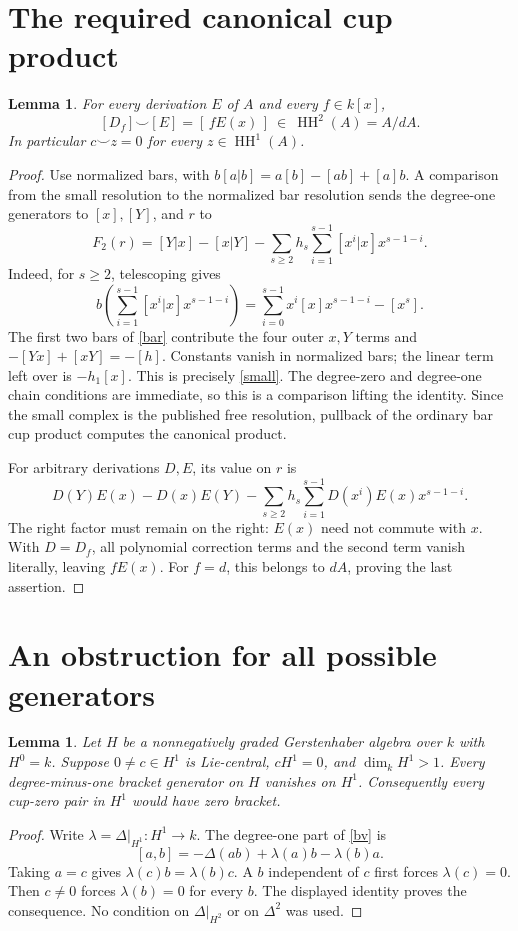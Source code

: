 \documentclass[11pt]{article}
\newtheorem{lemma}[theorem]{Lemma}
\theoremstyle{remark}\newtheorem{remark}[theorem]{Remark}
\newcommand{\HH}{\operatorname{HH}}
\begin{document}
\section{The required canonical cup product}
\begin{lemma}\label{cup}
For every derivation \(E\) of \(A\) and every \(f\in k[x]\),
\[
 [D_f]\smile[E]=[\,fE(x)\,]\ \in\ \HH^2(A)=A/dA.
\]
In particular \(c\smile z=0\) for every \(z\in\HH^1(A)\).
\end{lemma}
\begin{proof}
Use normalized bars, with
\(b[a|b]=a[b]-[ab]+[a]b\).
A comparison from the small resolution to the normalized bar resolution
sends the degree-one generators to \([x],[Y]\), and \(r\) to
\begin{equation}\label{bar}
 F_2(r)=[Y|x]-[x|Y]
       -\sum_{s\ge2}h_s\sum_{i=1}^{s-1}[x^i|x]x^{s-1-i}.
\end{equation}
Indeed, for \(s\ge2\), telescoping gives
\[
 b\!\left(\sum_{i=1}^{s-1}[x^i|x]x^{s-1-i}\right)
 =\sum_{i=0}^{s-1}x^i[x]x^{s-1-i}-[x^s].
\]
The first two bars of \eqref{bar} contribute the four outer \(x,Y\)
terms and \(-[Yx]+[xY]=-[h]\). Constants vanish in normalized bars;
the linear term left over is \(-h_1[x]\).
This is precisely \eqref{small}. The degree-zero and degree-one chain
conditions are immediate, so this is a comparison lifting the identity.
Since the small complex is the published free resolution, pullback of
the ordinary bar cup product computes the canonical product.

For arbitrary derivations \(D,E\), its value on \(r\) is
\[
 D(Y)E(x)-D(x)E(Y)
 -\sum_{s\ge2}h_s\sum_{i=1}^{s-1}
       D(x^i)E(x)x^{s-1-i}.
\]
The right factor must remain on the right: \(E(x)\) need not commute
with \(x\). With \(D=D_f\), all polynomial correction terms and the
second term vanish literally, leaving \(fE(x)\).
For \(f=d\), this belongs to \(dA\), proving the last assertion.
\end{proof}

\section{An obstruction for all possible generators}
\begin{lemma}\label{linear}
Let \(H\) be a nonnegatively graded Gerstenhaber algebra over \(k\)
with \(H^0=k\). Suppose \(0\ne c\in H^1\) is Lie-central,
\(cH^1=0\), and \(\dim_k H^1>1\).
Every degree-minus-one bracket generator on \(H\) vanishes on \(H^1\).
Consequently every cup-zero pair in \(H^1\) would have zero bracket.
\end{lemma}
\begin{proof}
Write \(\lambda=\Delta|_{H^1}:H^1\to k\).
The degree-one part of \eqref{bv} is
\[
 [a,b]=-\Delta(ab)+\lambda(a)b-\lambda(b)a.
\]
Taking \(a=c\) gives \(\lambda(c)b=\lambda(b)c\).
A \(b\) independent of \(c\) first forces \(\lambda(c)=0\).
Then \(c\ne0\) forces \(\lambda(b)=0\) for every \(b\).
The displayed identity proves the consequence. No condition on
\(\Delta|_{H^2}\) or on \(\Delta^2\) was used.
\end{proof}
\end{document}
